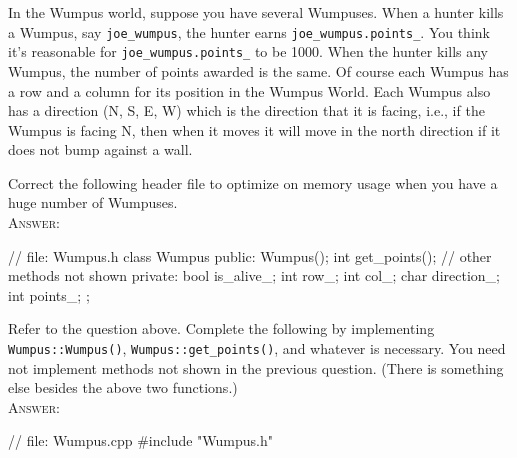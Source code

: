 

\renewcommand\AUTHOR{jdoe5@cougars.ccis.edu} %


\topmattertwo

\nextq
In the Wumpus world, suppose you have several Wumpuses.
When a hunter kills a Wumpus, say \verb!joe_wumpus!, the hunter earns
\verb!joe_wumpus.points_!.
You think it's reasonable for
\verb!joe_wumpus.points_! to be 1000.
When the hunter kills any Wumpus, the number of points
awarded is the same.
Of course each Wumpus has a row and a column for its position in the
Wumpus World.
Each Wumpus also has a direction (N, S, E, W) which is the direction
that it is facing, i.e., if the Wumpus is facing N, then when it moves
it will move in the north direction if it does not bump against a wall.

Correct the following header file to optimize on memory usage
when you have a huge number of Wumpuses.
\\
\textsc{Answer:}\vspace{-2mm}
\begin{answercode}
// file: Wumpus.h
class Wumpus
{
public:
    Wumpus();
    int get_points(); 
    // other methods not shown 
private:
    bool is_alive_;
    int row_;
    int col_;
    char direction_;
    int points_;
};
\end{answercode}

\nextq
Refer to the question above.
Complete the following by implementing
\verb!Wumpus::Wumpus()!,
\verb!Wumpus::get_points()!, and whatever is necessary.
You need not implement methods not shown in the previous question.
(There is something else besides the above two functions.)
\\
\textsc{Answer:}\vspace{-2mm}
\begin{answercode}
// file: Wumpus.cpp
#include "Wumpus.h"

\end{answercode}

